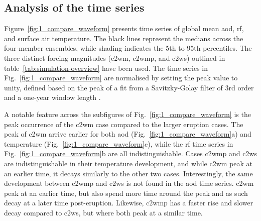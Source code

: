 \documentclass{ametsocV6.1}
\begin{document}

\subsection{Analysis of the time series}

Figure~\ref{fig:1_compare_waveform} presents time series of global mean \gls{aod},
\gls{rf}, and surface air temperature. The black lines represent the medians across the
four-member ensembles, while shading indicates the 5th to 95th percentiles. The three
distinct forcing magnitudes (\gls{c2wm}, \gls{c2wmp}, and \gls{c2ws}) outlined in
table~\ref{tab:simulation-overview} have been used. The time series in
Fig.~\ref{fig:1_compare_waveform} are normalised by setting the peak value to unity,
defined based on the peak of a fit from a Savitzky-Golay filter of 3rd order and a
one-year window length \citep{savitzky1964}.

A notable feature across the subfigures of Fig.~\ref{fig:1_compare_waveform} is the peak
occurrence of the \gls{c2wm} case compared to the larger eruption cases. The peak of
\gls{c2wm} arrive earlier for both \gls{aod} (Fig.~\ref{fig:1_compare_waveform}a) and
temperature (Fig.~\ref{fig:1_compare_waveform}c), while the \gls{rf} time series in
Fig.~\ref{fig:1_compare_waveform}b are all indistinguishable. Cases \gls{c2wmp} and
\gls{c2ws} are indistinguishable in their temperature development, and while \gls{c2wm}
peak at an earlier time, it decays similarly to the other two cases. Interestingly, the
same development between \gls{c2wmp} and \gls{c2ws} is not found in the \gls{aod} time
series. \gls{c2wm} peak at an earlier time, but also spend more time around the peak and
as such decay at a later time post-eruption. Likewise, \gls{c2wmp} has a faster rise and
slower decay compared to \gls{c2ws}, but where both peak at a similar time.
\end{document}
